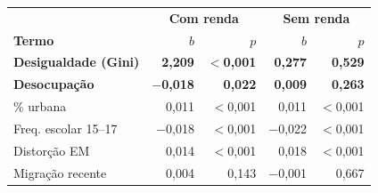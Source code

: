 \begin{tabular}{@{}lrrrr@{}}
\toprule
 & \multicolumn{2}{c}{\textbf{Com renda}} & \multicolumn{2}{c}{\textbf{Sem renda}}\\
\textbf{Termo} & \textbf{$b$} & \textbf{$p$} & \textbf{$b$} & \textbf{$p$}\\
\midrule
\textbf{Desigualdade (Gini)} & \textbf{2,209} & \textbf{$<$0,001} & \textbf{0,277} & \textbf{0,529}\\
\textbf{Desocupação} & \textbf{$-$0,018} & \textbf{0,022} & \textbf{0,009} & \textbf{0,263}\\
\% urbana & 0,011 & $<$0,001 & 0,011 & $<$0,001\\
Freq. escolar 15--17 & $-$0,018 & $<$0,001 & $-$0,022 & $<$0,001\\
Distorção EM & 0,014 & $<$0,001 & 0,018 & $<$0,001\\
Migração recente & 0,004 & 0,143 & $-$0,001 & 0,667\\
\bottomrule
\end{tabular}
